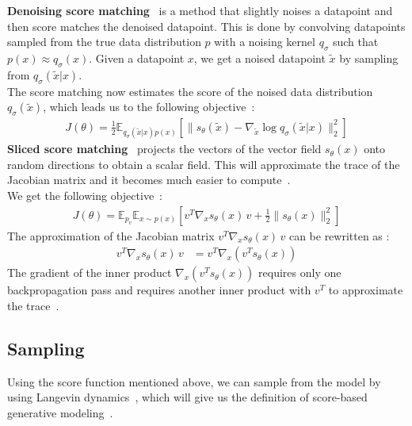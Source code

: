 \documentclass[twoside]{article}
\numberwithin{equation}{section}
\numberwithin{figure}{section}
\begin{document}
\textbf{Denoising score matching}~\cite{vincent2010denoising} is a method that slightly noises a datapoint and then score matches the denoised datapoint. This is done by convolving datapoints sampled from the true data distribution $p$ with a noising kernel $q_\sigma$ such that $p(x) \approx q_\sigma (x)$. Given a datapoint $x$, we get a noised datapoint $\tilde{x}$ by sampling from $q_\sigma(\tilde{x} | x)$. \\
The score matching now estimates the score of the noised data distribution $q_\sigma(\tilde{x})$, which leads us to the following objective~\cite{song2020generative, vincent2010denoising}:
\begin{align}
  J(\theta) = \frac{1}{2} \mathbb{E}_{q_\sigma(\tilde{x} | x) p(x)} \left[ \| s_\theta (\tilde{x}) - \nabla_{\tilde{x}} \log q_\sigma(\tilde{x} | x) \|_2^2 \right]
\end{align}
\textbf{Sliced score matching}~\cite{song2019sliced} projects the vectors of the vector field $s_\theta (x)$ onto random directions to obtain a scalar field. This will approximate the trace of the Jacobian matrix and it becomes much easier to compute~\cite{song2020generative}. \\
We get the following objective~\cite{song2019sliced}:
\begin{align}
  J(\theta) = \mathbb{E}_{p_v} \mathbb{E}_{x \sim p(x)} \left[ v^T \nabla_x s_\theta (x) \, v + \frac{1}{2} \| s_\theta (x) \|_2^2 \right]
\end{align}
The approximation of the Jacobian matrix $v^T \nabla_x s_\theta (x) \, v$ can be rewritten as \cite{song2019sliced}:
\begin{align}
  v^T \nabla_x s_\theta (x) \, v &= v^T \nabla_x (v^T s_\theta (x))
\end{align}
The gradient of the inner product $\nabla_x (v^T s_\theta (x))$ requires only one backpropagation pass and requires another inner product with $v^T$ to approximate the trace~\cite{song2019sliced}.

\subsection{Sampling}
Using the score function mentioned above, we can sample from the model by using Langevin dynamics~\cite{song2020generative, WelTeh2011a}, which will give us the definition of score-based generative modeling~\cite{song2020generative}.
\end{document}
